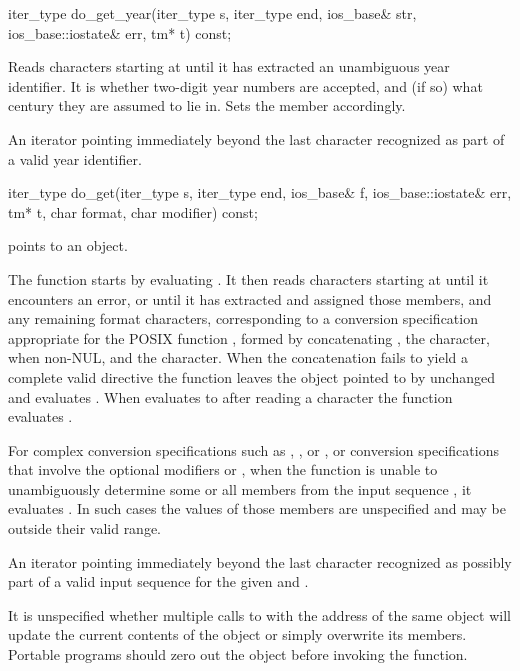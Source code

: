 %
\begin{itemdecl}
iter_type do_get_year(iter_type s, iter_type end, ios_base& str,
                      ios_base::iostate& err, tm* t) const;
\end{itemdecl}

\begin{itemdescr}
\pnum
\effects
Reads characters starting at 
until it has extracted an unambiguous year identifier.
It is
whether two-digit year numbers are accepted,
and (if so) what century they are assumed to lie in.
Sets the  member accordingly.

\pnum
\returns
An iterator pointing immediately beyond
the last character recognized as part of a valid year identifier.
\end{itemdescr}

%
\begin{itemdecl}
iter_type do_get(iter_type s, iter_type end, ios_base& f,
                 ios_base::iostate& err, tm* t, char format, char modifier) const;
\end{itemdecl}

\begin{itemdescr}
\pnum
\expects
{} points to an object.

\pnum
\effects
The function starts by evaluating .
It then reads characters starting at  until it encounters an error, or
until it has extracted and assigned those  members, and
any remaining format characters,
corresponding to a conversion specification appropriate for
the POSIX function ,
formed by concatenating ,
the  character, when non-NUL, and
the  character.
When the concatenation fails to yield a complete valid directive
the function leaves the object pointed to by  unchanged and
evaluates .
When  evaluates to  after reading a character
the function evaluates .

\pnum
For complex conversion specifications
such as , , or , or
conversion specifications that involve the optional modifiers  or ,
when the function is unable to unambiguously determine
some or all  members from the input sequence ,
it evaluates .
In such cases the values of those  members are unspecified
and may be outside their valid range.

\pnum
\returns
An iterator pointing immediately beyond
the last character recognized as possibly part of
a valid input sequence for the given  and .

\pnum
\remarks
It is unspecified whether multiple calls to 
with the address of the same  object
will update the current contents of the object or simply overwrite its members.
Portable programs should zero out the object before invoking the function.
\end{itemdescr}

